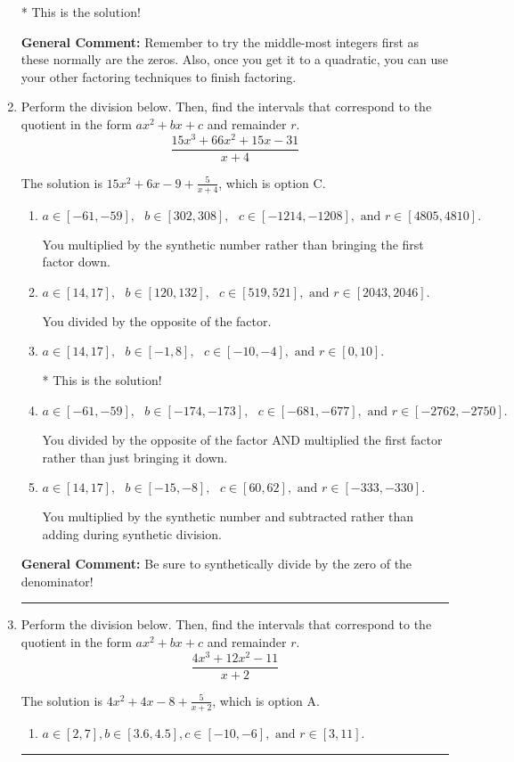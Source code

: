 \documentclass{extbook}[14pt]
\newcommand{\litem}[1]{\item #1

\rule{\textwidth}{0.4pt}}
\begin{document}
\begin{enumerate}
{\begin{enumerate}[label=\Alph*.]
* This is the solution!
\end{enumerate}

\textbf{General Comment:} Remember to try the middle-most integers first as these normally are the zeros. Also, once you get it to a quadratic, you can use your other factoring techniques to finish factoring.
}
\litem{
Perform the division below. Then, find the intervals that correspond to the quotient in the form $ax^2+bx+c$ and remainder $r$.
\[ \frac{15x^{3} +66 x^{2} +15 x -31}{x + 4} \]

The solution is \( 15x^{2} +6 x -9 + \frac{5}{x + 4} \), which is option C.\begin{enumerate}[label=\Alph*.]
\item \( a \in [-61, -59], \text{   } b \in [302, 308], \text{   } c \in [-1214, -1208], \text{   and   } r \in [4805, 4810]. \)

 You multiplied by the synthetic number rather than bringing the first factor down.
\item \( a \in [14, 17], \text{   } b \in [120, 132], \text{   } c \in [519, 521], \text{   and   } r \in [2043, 2046]. \)

 You divided by the opposite of the factor.
\item \( a \in [14, 17], \text{   } b \in [-1, 8], \text{   } c \in [-10, -4], \text{   and   } r \in [0, 10]. \)

* This is the solution!
\item \( a \in [-61, -59], \text{   } b \in [-174, -173], \text{   } c \in [-681, -677], \text{   and   } r \in [-2762, -2750]. \)

 You divided by the opposite of the factor AND multiplied the first factor rather than just bringing it down.
\item \( a \in [14, 17], \text{   } b \in [-15, -8], \text{   } c \in [60, 62], \text{   and   } r \in [-333, -330]. \)

 You multiplied by the synthetic number and subtracted rather than adding during synthetic division.
\end{enumerate}

\textbf{General Comment:} Be sure to synthetically divide by the zero of the denominator!
}
\litem{
Perform the division below. Then, find the intervals that correspond to the quotient in the form $ax^2+bx+c$ and remainder $r$.
\[ \frac{4x^{3} +12 x^{2} -11}{x + 2} \]

The solution is \( 4x^{2} +4 x -8 + \frac{5}{x + 2} \), which is option A.\begin{enumerate}[label=\Alph*.]
\item \( a \in [2, 7], b \in [3.6, 4.5], c \in [-10, -6], \text{ and } r \in [3, 11]. \)


\end{enumerate}}
\end{enumerate}
\end{document}
